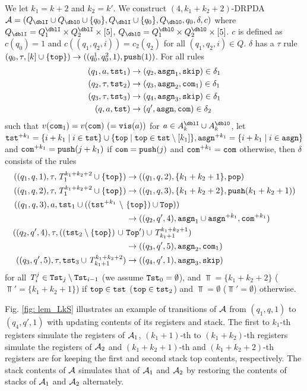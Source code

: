 We let $k_1=k+2$ and $k_2=k'$.
We construct $(4,k_1+k_2+2)$-DRPDA
$\calA=(Q_\dblI\cup Q_\dblO\cup\{q_0\}, Q_\dblI\cup\{q_0\}, Q_\dblO, q_0, \delta, c)$
where $Q_\dblI=Q^\dblI_1\times Q^\dblI_2\times[5]$,
$Q_\dblO=Q^\dblO_1\times Q^\dblO_2\times[5]$.
$c$ is defined as $c(q_0)=1$ and
$c((q_1,q_2,i))=c_2(q_2)$ for all $(q_1,q_2,i)\in Q$.
$\delta$ has a $\tau$ rule $(q_0,\tau,[k]\cup\{\mathtt{top}\})\to((q^1_0, q^2_0,1), \mathtt{push}(1))$.
For all rules
\begin{align}
(q_1, a, \mathtt{tst}_1) &\to (q_2,\mathtt{asgn}_1, \mathtt{skip})\in\delta_1\label{eq: LkS1}\\
(q_2, \tau, \mathtt{tst}_2) &\to (q_3,\mathtt{asgn}_2, \mathtt{com}_1)\in\delta_1\label{eq: LkS2}\\
(q_3, \tau, \mathtt{tst}_3) &\to (q_4,\mathtt{asgn}_3, \mathtt{skip})\in\delta_1\label{eq: LkS3}\\
(q, a, \mathtt{tst}) &\to (q',\mathtt{asgn}, \mathtt{com})\in\delta_2\label{eq: LkS4}
\end{align}
such that $v(\mathtt{com}_1)=v(\mathtt{com})\ (=\mathtt{vis}(a))$ for $a\in A^\dblI_{k}\cup A^\dblO_{k}$,
let $\mathtt{tst}^{+ k_1}=\{i+k_1\mid i\in\mathtt{tst}\}\cup\{\mathtt{top}\mid\mathtt{top}\in\mathtt{tst}\setminus[k_1]\}, \mathtt{asgn}^{+ k_1}=\{i+k_1\mid i\in\mathtt{asgn}\}$ and $\mathtt{com}^{+ k_1} = \mathtt{push}(j+k_1)$ if $\mathtt{com}=\mathtt{push}(j)$ and $\mathtt{com}^{+ k_1} = \mathtt{com}$ otherwise, then $\delta$ consists of the rules
\begin{align}
((q_1, q, 1), \tau, \T^{k_1+k_2+2}_{1}\cup\{\top\}) &\to ((q_1, q, 2), \{k_1+k_2+1\}, \pop)\label{eq: LkS5}\\
((q_1, q, 2), \tau, \T^{k_1+k_2+2}_{1}\cup\{\top\})&\to ((q_1, q, 3), \{k_1+k_2+2\}, \push(k_1+k_2+1)) \label{eq: LkS6}\\
((q_1, q, 3), a,
\tst_1\cup ((\tst^{+ k_1}\ \setminus\ &\{\top\})\cup\Top))\nonumber\\
&\to ((q_2, q', 4), \asgn_1\cup\asgn^{+ k_1}, \com^{+ k_1})\label{eq: LkS7}\\
((q_2, q', 4), \tau,((\tst_2\setminus\{\top\})\ \cup\ &\Top')\cup\T^{k_1+k_2+1}_{k_1+1})\nonumber\\
&\to ((q_3, q', 5), \asgn_2, \com_1)\label{eq: LkS8}\\
((q_3, q', 5), \tau, \tst_3\cup\T^{k_1+k_2+2}_{k_1+1}) &\to ((q_4, q', 1), \asgn_3, \skip)\label{eq: LkS9}
\end{align}
for all $\mathit{T}^{j}_{i}\in\mathtt{Tst}_{j}\setminus\mathtt{Tst}_{i-1}$ (we assume $\mathtt{Tst}_0=\emptyset$), and
$\Top=\{k_1+k_2+2\}$ ($\Top'=\{k_1+k_2+1\}$) if $\mathtt{top}\in\mathtt{tst}$ ($\mathtt{top}\in\mathtt{tst}_2$) and $\Top=\emptyset$ ($\Top'=\emptyset$) otherwise.

Fig. \ref{fig: lem_LkS} illustrates an example of transitions of ${\cal A}$
from $(q_1,q,1)$ to $(q_4,q',1)$ with updating
contents of its registers and stack.
The first to $k_1$-th registers simulate
the registers of ${\cal A}_1$,
$(k_1+1)$-th to $(k_1+k_2)$-th registers simulate
the registers of ${\cal A}_2$ and
$(k_1+k_2+1)$-th and $(k_1+k_2+2)$-th registers
are for keeping the first and second stack top contents, respectively.
The stack contents of ${\cal A}$ simulates that of ${\cal A}_1$ and ${\cal A}_2$ by restoring the contents of stacks of ${\cal A}_1$ and ${\cal A}_2$ alternately.

